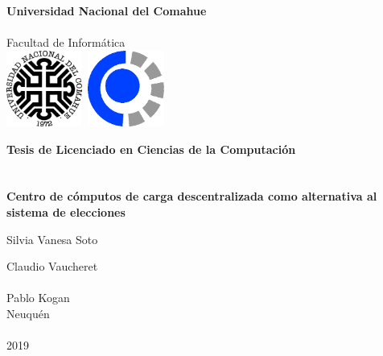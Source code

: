 
\titlepage

\begin{center}
\ \\
\ \\
\vspace{-1cm}
 

\ \\

\vspace{0.5cm}
{\Large{\bf \sc Universidad Nacional del Comahue}}\\

\ \\
{\Large { \sc Facultad de Informática}}\\

\vspace{-2.5cm}
\mbox{\hspace{-1cm}\includegraphics[width=2.5cm,height=2.5cm]{unc.png}\hspace{13cm} \includegraphics[width=2.5cm,height=2.5cm]{fai.png}}


\vspace{6cm}

{\Large {\bf\sc Tesis de Licenciado en Ciencias de la Computaci\'on}}\\
\ \\
\ \\
{\LARGE {\bf Centro de cómputos de carga descentralizada como alternativa al sistema de elecciones}}\\
\vspace{3cm}


{\Large Silvia Vanesa Soto}\\
\vspace{2cm}

{\Large Claudio Vaucheret}\\
\ \\
{\Large Pablo Kogan}\\

\vfill
{\Large {\sc Neuqu\'en}\hspace{6cm}{\sc Argentina}}\\
\ \\

{\Large 2019}\\

\end{center}

\pagebreak

